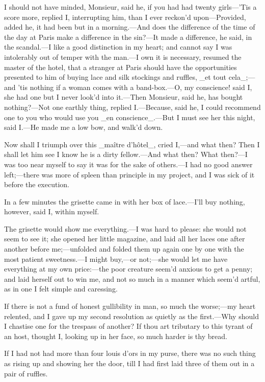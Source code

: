 \documentclass[twoside]{article}
\begin{document}
I should not have minded, Monsieur, said he, if you had had twenty
girls—’Tis a score more, replied I, interrupting him, than I ever
reckon’d upon—Provided, added he, it had been but in a morning.—And does
the difference of the time of the day at Paris make a difference in the
sin?—It made a difference, he said, in the scandal.—I like a good
distinction in my heart; and cannot say I was intolerably out of temper
with the man.—I own it is necessary, resumed the master of the hotel,
that a stranger at Paris should have the opportunities presented to him
of buying lace and silk stockings and ruffles, _et tout cela_;—and ’tis
nothing if a woman comes with a band-box.—O, my conscience! said I, she
had one but I never look’d into it.—Then Monsieur, said he, has bought
nothing?—Not one earthly thing, replied I.—Because, said he, I could
recommend one to you who would use you _en conscience_.—But I must see
her this night, said I.—He made me a low bow, and walk’d down.

Now shall I triumph over this _maître d’hôtel_, cried I,—and what then?
Then I shall let him see I know he is a dirty fellow.—And what then?
What then?—I was too near myself to say it was for the sake of others.—I
had no good answer left;—there was more of spleen than principle in my
project, and I was sick of it before the execution.

In a few minutes the grisette came in with her box of lace.—I’ll buy
nothing, however, said I, within myself.

The grisette would show me everything.—I was hard to please: she would
not seem to see it; she opened her little magazine, and laid all her
laces one after another before me;—unfolded and folded them up again one
by one with the most patient sweetness.—I might buy,—or not;—she would
let me have everything at my own price:—the poor creature seem’d anxious
to get a penny; and laid herself out to win me, and not so much in a
manner which seem’d artful, as in one I felt simple and caressing.

If there is not a fund of honest gullibility in man, so much the
worse;—my heart relented, and I gave up my second resolution as quietly
as the first.—Why should I chastise one for the trespass of another?  If
thou art tributary to this tyrant of an host, thought I, looking up in
her face, so much harder is thy bread.

If I had not had more than four louis d’ors in my purse, there was no
such thing as rising up and showing her the door, till I had first laid
three of them out in a pair of ruffles.
\end{document}

